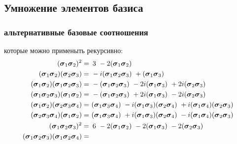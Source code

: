\documentclass{beamer}
\begin{document}
\subsection{Умножение элементов базиса}
\begin{frame}
\frametitle{альтернативные базовые соотношения}
которые можно применыть рекурсивно:
\small
\begin{align}
  (\ssigma_1\ssigma_2)^2 = & \,\,\,  3\
  -2 (\ssigma_1\ssigma_2)				%
  \\
  (\ssigma_1\ssigma_2)(\ssigma_2\ssigma_3) = &\
  -i(\ssigma_1\ssigma_2\ssigma_3)\
  +(\ssigma_1\ssigma_3)					%
  \\
  (\ssigma_1\ssigma_2)(\ssigma_1\ssigma_2\ssigma_3) = &\
  -(\ssigma_1\ssigma_2\ssigma_3)\
  -2i(\ssigma_1\ssigma_3)\
  +2i(\ssigma_2\ssigma_3)				%
  \\
  (\ssigma_1\ssigma_2\ssigma_3)(\ssigma_1\ssigma_2) = &\
  -(\ssigma_1\ssigma_2\ssigma_3)\
  +2i(\ssigma_1\ssigma_3)\
  -2i(\ssigma_2\ssigma_3)				%
  \\
  (\ssigma_1\ssigma_2)(\ssigma_2\ssigma_3\ssigma_4) = & \
  (\ssigma_1\ssigma_3\ssigma_4)\
  -i(\ssigma_1\ssigma_3)(\ssigma_2\ssigma_4)\
  +i(\ssigma_1\ssigma_4)(\ssigma_2\ssigma_3)		%
  \\
  (\ssigma_2\ssigma_3\ssigma_4)(\ssigma_1\ssigma_2) =  &\
  (\ssigma_1\ssigma_3\ssigma_4)\
  +i(\ssigma_1\ssigma_3)(\ssigma_2\ssigma_4)\
  -i(\ssigma_1\ssigma_4)(\ssigma_2\ssigma_3)		%
  \\
  (\ssigma_1\ssigma_2\ssigma_3)^2 = &\,\,\,6\
  -2(\ssigma_1\ssigma_2)\
  -2(\ssigma_1\ssigma_3)\
  -2(\ssigma_2\ssigma_3)				%
  \\
  (\ssigma_1\ssigma_2\ssigma_3)(\ssigma_1\ssigma_2\ssigma_4) = &\

\end{align}
\end{frame}
\end{document}
